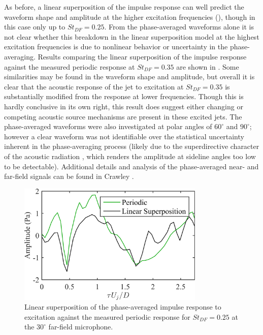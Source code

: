 As before, a linear superposition of the impulse response can well predict the waveform shape and amplitude at the higher excitation frequencies (), though in this case only up to $St_{DF}  = 0.25$. 
From the phase-averaged waveforms alone it is not clear whether this breakdown in the linear superposition model at the highest excitation frequencies is due to nonlinear behavior or uncertainty in the phase-averaging. 
Results comparing the linear superposition of the impulse response against the measured periodic response at $St_{DF}  = 0.35$ are shown in .
Some similarities may be found in the waveform shape and amplitude, but overall it is clear that the acoustic response of the jet to excitation at $St_{DF}  = 0.35$ is substantially modified from the response at lower frequencies.
Though this is hardly conclusive in its own right, this result does suggest either changing or competing acoustic source mechanisms are present in these excited jets.
The phase-averaged waveforms were also investigated at polar angles of $60^\circ$ and $90^\circ$; however a clear waveform was not identifiable over the statistical uncertainty inherent in the phase-averaging process (likely due to the superdirective character of the acoustic radiation \citep{Crighton1990}, which renders the amplitude at sideline angles too low to be detectable).
Additional details and analysis of the phase-averaged near- and far-field signals can be found in Crawley \etal \citep{Crawley2015}.
\begin{figure}
	\centering
	\includegraphics[width=3.5in]{Figures/ch3_farfield_linearsuperposition_st035_v2.png}
	\caption{Linear superposition of the phase-averaged impulse response to excitation against the measured periodic response for $St_{DF} = 0.25$ at the  $30^\circ$ far-field microphone.}
	\label{fig:ch3_farfield_nonlinear}
\end{figure}

